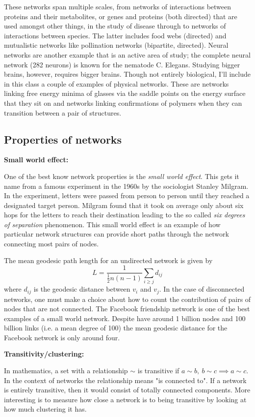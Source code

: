 \documentclass{article}
\begin{document}
These networks span multiple scales, from networks of interactions between proteins and their metabolites, or genes and proteins (both directed) that are used amongst other things, in the study of disease through to networks of interactions between species. The latter includes food webs (directed) and mutualistic networks like pollination networks (bipartite, directed). Neural networks are another example that is an active area of study; the complete neural network (282 neurons) is known for the nematode C. Elegans. Studying bigger brains, however, requires bigger brains. Though not entirely biological, I'll include in this class a couple of examples of physical networks. These are networks linking free energy minima of glasses via the saddle points on the energy surface that they sit on and networks linking confirmations of polymers when they can transition between a pair of structures. 


\subsection*{Properties of networks}

{\bf Small world effect:}

One of the best know network properties is the \emph{small world effect}. This gets it name from a famous experiment in the 1960s by the sociologist Stanley Milgram. In the experiment, letters were passed from person to person until they reached a designated target person. Milgram found that it took on average only about six hops for the letters to reach their destination leading to the so called \emph{six degrees of separation} phenomenon. This small world effect is an example of how particular network structures can provide short paths through the network connecting most pairs of nodes. 

The mean geodesic path length for an undirected network is given by
$$
	L =\frac{1}{\frac12 n(n-1)}\sum_{i\geq j} d_{ij}
$$
where $d_{ij}$ is the geodesic distance between $v_i$ and $v_j$. In the case of disconnected networks, one must make a choice about how to count the contribution of pairs of nodes that are not connected. The Facebook friendship network is one of the best examples of a small world network. Despite have around 1 billion nodes and 100 billion links (i.e. a mean degree of 100) the mean geodesic distance for the Facebook network is only around four.

{\bf Transitivity/clustering:}

In mathematics, a set with a relationship $\sim$ is transitive if $a \sim b,~b\sim c \implies a \sim c$. In the context of networks the relationship means "is connected to". If a network is entirely transitive, then it would consist of totally connected components. More interesting is to measure how close a network is to being transitive by looking at how much clustering it has.
\end{document}
